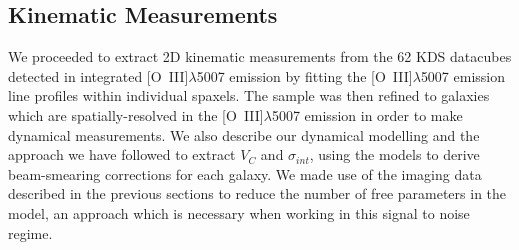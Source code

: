 \documentclass[fleqn,usenatbib]{mnras}
\begin{document}

\subsection{Kinematic Measurements}\label{subsection:kinematic_measurements}

We proceeded to extract 2D kinematic measurements from the 62 KDS datacubes detected in integrated [O~{\sc III}]$\lambda$5007 emission by fitting the [O~{\sc III}]$\lambda$5007 emission line profiles within individual spaxels.
The sample was then refined to galaxies which are spatially-resolved in the [O~{\sc III}]$\lambda$5007 emission in order to make dynamical measurements.
We also describe our dynamical modelling and the approach we have followed to extract $V_{C}$ and $\sigma_{int}$, using the models to derive beam-smearing corrections for each galaxy.
We made use of the imaging data described in the previous sections to reduce the number of free parameters in the model, an approach which is necessary when working in this signal to noise regime.  
\end{document}
